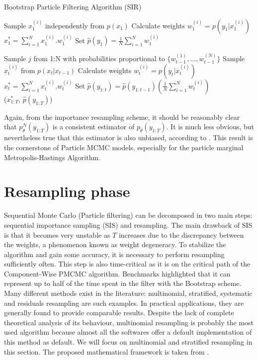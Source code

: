 \documentclass[11pt,a4,twosided,singlespacing,titlepagenumber=on]{scrreprt}
\numberwithin{equation}{chapter} %
\theoremstyle{remark}
\begin{document}
\begin{algorithm}
\caption{Bootstrap Particle Filtering Algorithm (SIR)}\label{euclid}
\begin{algorithmic}[1]
	\State Sample $x_1^{(i)}$ independently from $p(x_1)$
	\State Calculate weights $w_1^{(i)} = p(y_1 | x_1^{(i)})$
\State $x^*_1 = \sum_{i=1}^N x_1^{(i)}.w_1^{(i)}$
\State Set $\hat{p}(y_1) = \frac{1}{N} \sum_{i=1}^N w_1^{(i)}$

		\State Sample $j$ from 1:N with probabilities proportional to $\{w_{t-1}^{(1)},..., w_{t-1}^{(N)}\}$
		\State Sample $x_t^{(i)}$ from $p(x_t|x_{t-1})$
		\State Calculate weights $w_t^{(i)} = p(y_t|x_t^{(i)})$
	\State $x^*_t = \sum_{i=1}^N x_t^{(i)}.w_t^{(i)}$
	\State Set $\hat{p}(y_{1:t}) = \hat{p}(y_{1:t-1}) \left(\frac{1}{N} \sum_{i=1}^N w_t^{(i)} \right)$
\\
\Return ($x^*_{1:T}$, $\hat{p}(y_{1:T})$)
\EndProcedure
\end{algorithmic}
\end{algorithm}


Again, from the importance resampling scheme, it should be reasonably clear that $p^N_{\theta}(y_{1:T})$ is a consistent estimator of $p_{\theta}(y_{1:T})$. It is much less obvious, but nevertheless true that this estimator is also unbiased, according to \cite{delmoral2004}. This result is the cornerstone of Particle MCMC models, especially for the particle marginal Metropolis-Hastings Algorithm.

\section{Resampling phase}
Sequential Monte Carlo (Particle filtering) can be decomposed in two main steps: sequential importance sampling (SIS) and resampling. The main drawback of SIS is that it becomes very unstable as $T$ increases due to the discrepancy between the weights, a phenomenon known as weight degeneracy. To stabilize the algorithm and gain some accuracy, it is necessary to perform resampling sufficiently often. This step is also time-critical as it is on the critical path of the Component-Wise PMCMC algorithm. Benchmarks highlighted that it can represent up to half of the time spent in the filter with the Bootstrap scheme. Many different methods exist in the literature: multinomial, stratified, systematic and residuals resampling are such examples. In practical applications, they are generally found to provide comparable results. Despite the lack of complete theoretical analysis of its behaviour, multinomial resampling is probably the most used algorithm because almost all the softwares offer a default implementation of this method as default. We will focus on multinomial and stratified resampling in this section. The proposed mathematical framework is taken from \cite{douc2005}. \\
\end{document}
